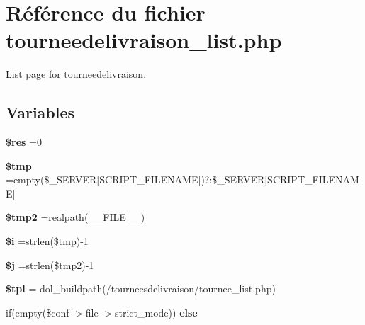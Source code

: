 \hypertarget{tourneedelivraison__list_8php}{}\section{Référence du fichier tourneedelivraison\+\_\+list.\+php}
\label{tourneedelivraison__list_8php}


List page for tourneedelivraison.  


\subsection*{Variables}
\begin{DoxyCompactItemize}
\item 
\mbox{\label{tourneedelivraison__list_8php_a49a8a4009b02e49717caa88b128affc5}} 
{\bfseries \$res} =0
\item 
\mbox{\label{tourneedelivraison__list_8php_a57024d47cf8348153f5fdda16f8fefa9}} 
{\bfseries \$tmp} =empty(\$\+\_\+\+S\+E\+R\+V\+ER\mbox{[}\textquotesingle{}S\+C\+R\+I\+P\+T\+\_\+\+F\+I\+L\+E\+N\+A\+ME\textquotesingle{}\mbox{]})?\textquotesingle{}\textquotesingle{}\+:\$\+\_\+\+S\+E\+R\+V\+ER\mbox{[}\textquotesingle{}S\+C\+R\+I\+P\+T\+\_\+\+F\+I\+L\+E\+N\+A\+ME\textquotesingle{}\mbox{]}
\item 
\mbox{\label{tourneedelivraison__list_8php_aed9bcb6730d1510376ce80e32bd9504d}} 
{\bfseries \$tmp2} =realpath(\+\_\+\+\_\+\+F\+I\+L\+E\+\_\+\+\_\+)
\item 
\mbox{\label{tourneedelivraison__list_8php_a83018d9153d17d91fbcf3bc10158d34f}} 
{\bfseries \$i} =strlen(\$tmp)-\/1
\item 
\mbox{\label{tourneedelivraison__list_8php_a6f16db779ef3ccea921b277b5dc245d1}} 
{\bfseries \$j} =strlen(\$tmp2)-\/1
\item 
\mbox{\label{tourneedelivraison__list_8php_a04b1944cdb09f9a4e290cde7a12499e6}} 
{\bfseries \$tpl} = dol\+\_\+buildpath(\textquotesingle{}/tourneesdelivraison/tournee\+\_\+list.\+php\textquotesingle{})
\item 
if(empty(\$conf-\/$>$file-\/$>$strict\+\_\+mode)) {\bfseries else}
\end{DoxyCompactItemize}


